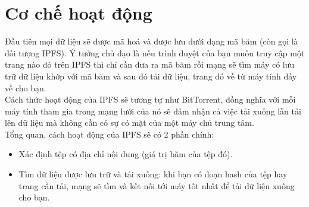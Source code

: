 \section{Cơ chế hoạt động}

Đầu tiên mọi dữ liệu sẽ được mã hoá và được lưu dưới dạng mã băm (còn gọi là đối tượng IPFS). Ý tưởng chủ đạo là nếu trình duyệt của bạn muốn truy cập một trang nào đó trên IPFS thì chỉ cần đưa ra mã băm rồi mạng sẽ tìm máy có lưu trữ dữ liệu khớp với mã băm và sau đó tải dữ liệu, trang đó về từ máy tính đấy về cho bạn.\\

Cách thức hoạt động của IPFS sẽ tương tự như BitTorrent, đồng nghĩa với mỗi máy tính tham gia trong mạng lưới của nó sẽ đảm nhận cả việc tải xuống lẫn tải lên dữ liệu mà không cần có sự có mặt của một máy chủ trung tâm.\\

Tổng quan, cách hoạt động của IPFS sẽ có 2 phần chính:

\begin{itemize}
    \item Xác định tệp có địa chỉ nội dung (giá trị băm của tệp đó).
    \item Tìm dữ liệu được lưu trữ và tải xuống: khi bạn có đoạn hash của tệp hay trang cần tải, mạng sẽ tìm và kết nối tới máy tốt nhất để tải dữ liệu xuống cho bạn.
\end{itemize}